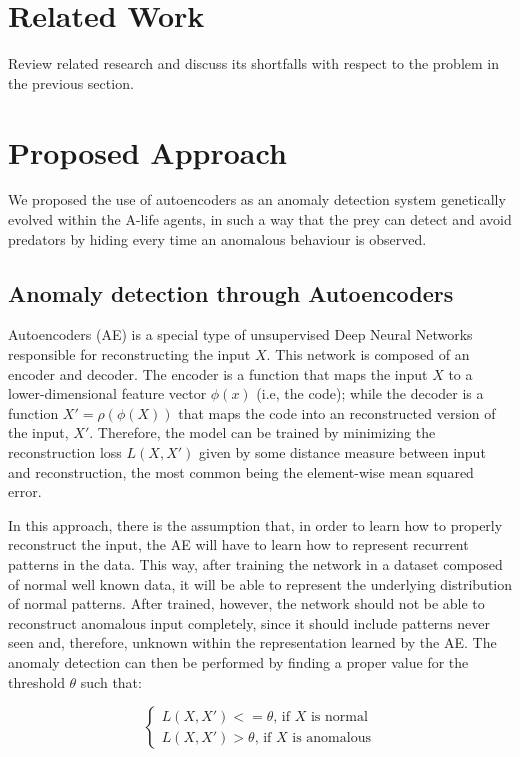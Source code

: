 \documentclass[letterpaper]{article}
\numberwithin{equation}{section}
\numberwithin{theorem}{section}
\numberwithin{lemma}{section}
\numberwithin{df}{section}
\begin{document}
\section{Related Work}

Review related research and discuss its shortfalls with respect to the problem in the previous section. 

\section{Proposed Approach}

We proposed the use of autoencoders as an anomaly detection system genetically evolved within the A-life agents, in such a way that the prey can detect and avoid predators by hiding every time an anomalous behaviour is observed.

\subsection{Anomaly detection through Autoencoders}

Autoencoders (AE) is a special type of unsupervised Deep Neural Networks responsible for reconstructing the input $X$. This network is composed of an encoder and decoder. The encoder is a function that maps the input $X$ to a lower-dimensional feature vector $\phi(x)$ (i.e, the code); while the decoder is a function $X' = \rho(\phi(X))$ that maps the code into an reconstructed version of the input, $X'$. Therefore, the model can be trained by minimizing the reconstruction loss $L(X, X')$ given by some distance measure between input and reconstruction, the most common being the element-wise mean squared error.

In this approach, there is the assumption that, in order to learn how to properly reconstruct the input, the AE will have to learn how to represent recurrent patterns in the data. This way, after training the network in a dataset composed of normal well known data, it will be able to represent the underlying distribution of normal patterns. After trained, however, the network should not be able to reconstruct anomalous input completely, since it should include patterns never seen and, therefore, unknown within the representation learned by the AE. The anomaly detection can then be performed by finding a proper value for the threshold $\theta$ such that:

\begin{equation}
\begin{cases}
L(X, X') <= \theta \text{, if $X$ is normal} \\
L(X, X') > \theta \text{, if $X$ is anomalous}
\end{cases}
\end{equation} 
\end{document}
